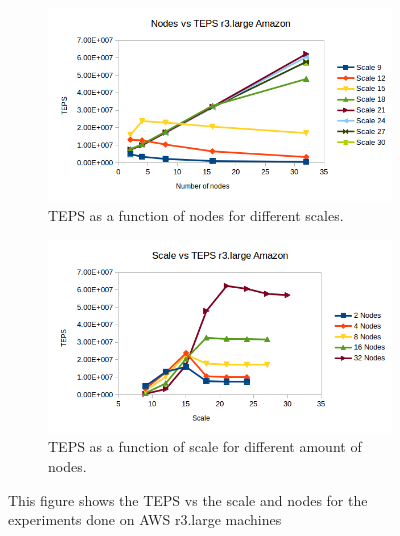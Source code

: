 \begin{figure}[!h]
	\centering
	\begin{subfigure}{.5\textwidth}
		\centering
		\includegraphics[width=\linewidth]{images/nodes_r3_amazon.png}
		\caption{TEPS as a function of nodes for different scales.}
		\label{fig:nodes_r3_amazon}
	\end{subfigure}%
	\begin{subfigure}{.5\textwidth}
		\centering
		\includegraphics[width=\linewidth]{images/scale_r3_amazon.png}
		\caption{TEPS as a function of scale for different amount of nodes.}
		\label{fig:scale_r3_amazon}
	\end{subfigure}
	\caption{This figure shows the TEPS vs the scale and nodes for the experiments done on AWS r3.large machines}
	\label{fig:r3_amazon}
\end{figure}


